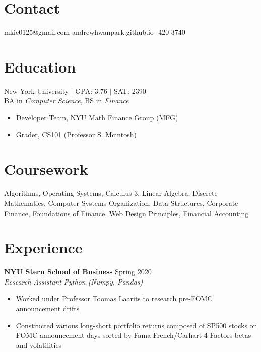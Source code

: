 \documentclass[margin]{res}
\begin{document}
 
 
 
\begin{resume} 
	 
	\section{Contact} 
	mkie0125@gmail.com \quad\quad\quad andrewhwanpark.github.io \quad\quad{}-420-3740
	
	\section{Education} 
	New York University $\vert$ GPA: 3.76 $\vert$ SAT: 2390 \\
	BA in {\it Computer Science}, BS in {\it Finance} 
	
	\begin{itemize} \itemsep -2pt  %
		\item Developer Team, NYU Math Finance Group (MFG)
		\item Grader, CS101 (Professor S. Mcintosh)
	\end{itemize}
	
	\section{Coursework}
	Algorithms, Operating Systems, Calculus 3, Linear Algebra, Discrete Mathematics, Computer Systems Organization, Data Structures, Corporate Finance, Foundations of Finance, Web Design Principles, Financial Accounting
	
	\section{Experience}
	{\bf NYU Stern School of Business} \hfill Spring 2020\\
	{\it Research Assistant} \hfill {\it Python (Numpy, Pandas)}
	\begin{itemize} \itemsep -2pt  %
		\item Worked under Professor Toomas Laarits to research pre-FOMC announcement drifts
		\item Constructed various long-short portfolio returns composed of SP500 stocks on FOMC announcement days sorted by Fama French/Carhart 4 Factors betas and volatilities
	\end{itemize}
	

\end{resume}
\end{document}
